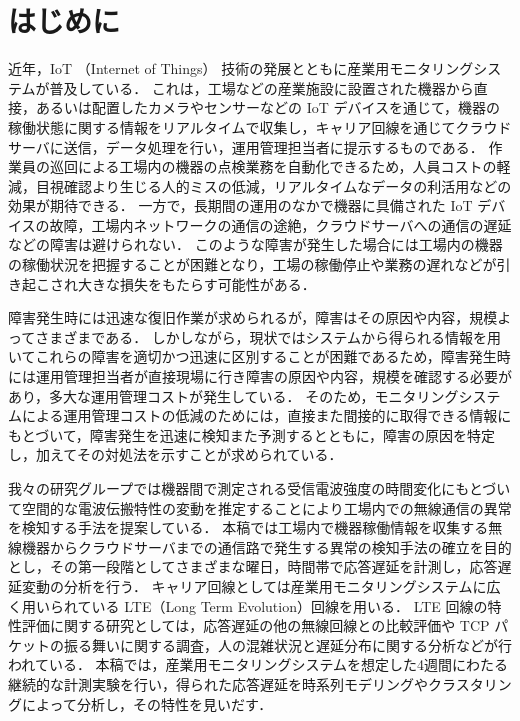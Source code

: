 \documentclass[technicalreport]{ieicej}
\begin{document}
\section{はじめに}
近年，IoT （Internet of Things） 技術の発展とともに産業用モニタリングシステム\cite{lima2012embedded}が普及している．
これは，工場などの産業施設に設置された機器から直接，あるいは配置したカメラやセンサーなどの IoT デバイスを通じて，機器の稼働状態に関する情報をリアルタイムで収集し，キャリア回線を通じてクラウドサーバに送信，データ処理を行い，運用管理担当者に提示するものである．
作業員の巡回による工場内の機器の点検業務を自動化できるため，人員コストの軽減，目視確認より生じる人的ミスの低減，リアルタイムなデータの利活用などの効果が期待できる．
一方で，長期間の運用のなかで機器に具備された IoT デバイスの故障，工場内ネットワークの通信の途絶，クラウドサーバへの通信の遅延などの障害は避けられない．
このような障害が発生した場合には工場内の機器の稼働状況を把握することが困難となり，工場の稼働停止や業務の遅れなどが引き起こされ大きな損失をもたらす可能性がある．

障害発生時には迅速な復旧作業が求められるが，障害はその原因や内容，規模よってさまざまである．
しかしながら，現状ではシステムから得られる情報を用いてこれらの障害を適切かつ迅速に区別することが困難であるため，障害発生時には運用管理担当者が直接現場に行き障害の原因や内容，規模を確認する必要があり，多大な運用管理コストが発生している．
そのため，モニタリングシステムによる運用管理コストの低減のためには，直接また間接的に取得できる情報にもとづいて，障害発生を迅速に検知また予測するとともに，障害の原因を特定し，加えてその対処法を示すことが求められている．

我々の研究グループでは機器間で測定される受信電波強度の時間変化にもとづいて空間的な電波伝搬特性の変動を推定することにより工場内での無線通信の異常を検知する手法を提案している\cite{prev}．
本稿では工場内で機器稼働情報を収集する無線機器からクラウドサーバまでの通信路で発生する異常の検知手法の確立を目的とし，その第一段階としてさまざまな曜日，時間帯で応答遅延を計測し，応答遅延変動の分析を行う．
キャリア回線としては産業用モニタリングシステムに広く用いられている LTE（Long Term Evolution）回線を用いる．
LTE 回線の特性評価に関する研究としては，応答遅延の他の無線回線との比較評価\cite{striegel2014lte}\cite{garcia2015delay}や TCP パケットの振る舞いに関する調査\cite{huang2013depth}，人の混雑状況と遅延分布に関する分析\cite{distribution}などが行われている．
本稿では，産業用モニタリングシステムを想定した4週間にわたる継続的な計測実験を行い，得られた応答遅延を時系列モデリングやクラスタリングによって分析し，その特性を見いだす．
\end{document}
